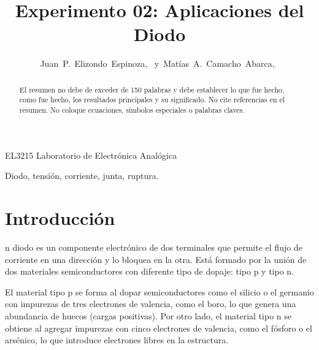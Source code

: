 \documentclass[journal]{IEEEtran}
\begin{document}
%
\title{Experimento 02: Aplicaciones del Diodo}


\author{Juan~P.~Elizondo~Espinoza,~
        y~Matías~A.~Camacho~Abarca,~
}


%
{EL3215 Laboratorio de Electrónica Analógica}


\maketitle


\begin{abstract}
El resumen no debe de exceder de 150 palabras y debe establecer lo que fue hecho, como fue hecho, los resultados principales y su significado. No cite referencias en el resumen. No coloque ecuaciones, símbolos especiales o palabras claves.
\end{abstract}

\begin{IEEEkeywords}
Diodo, tensión, corriente, junta, ruptura.
\end{IEEEkeywords}


\section{Introducción}

n diodo es un componente electrónico de dos terminales que permite el flujo de corriente en una dirección y lo bloquea en la otra. Está formado por la unión de dos materiales semiconductores con diferente tipo de dopaje: tipo p y tipo n.

El material tipo p se forma al dopar semiconductores como el silicio o el germanio con impurezas de tres electrones de valencia, como el boro, lo que genera una abundancia de huecos (cargas positivas). Por otro lado, el material tipo n se obtiene al agregar impurezas con cinco electrones de valencia, como el fósforo o el arsénico, lo que introduce electrones libres en la estructura.
\end{document}
